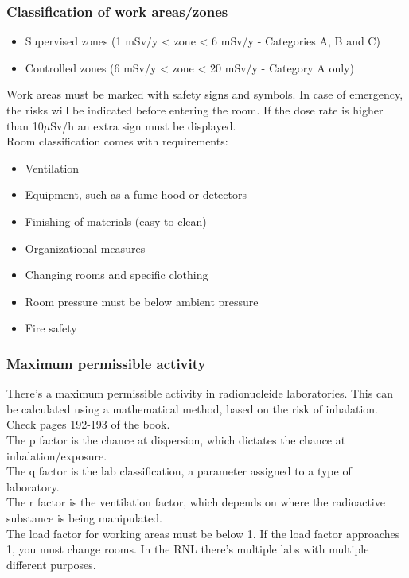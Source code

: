 \subsubsection{Classification of work areas/zones}
\begin{itemize}
	\item Supervised zones (1 mSv/y < zone < 6 mSv/y - Categories A, B and C)
	\item Controlled zones (6 mSv/y < zone < 20 mSv/y - Category A only)
\end{itemize}
Work areas must be marked with safety signs and symbols. In case of emergency, the risks will be indicated before entering the room. If the dose rate is higher than 10$\mu$Sv/h an extra sign must be displayed.\\
Room classification comes with requirements:
\begin{itemize}
	\item Ventilation
	\item Equipment, such as a fume hood or detectors
	\item Finishing of materials (easy to clean)
	\item Organizational measures
	\item Changing rooms and specific clothing
	\item Room pressure must be below ambient pressure
	\item Fire safety
\end{itemize}

\subsubsection{Maximum permissible activity}
There's a maximum permissible activity in radionucleide laboratories. This can be calculated using a mathematical method, based on the risk of inhalation. Check pages 192-193 of the book.\\
The p factor is the chance at dispersion, which dictates the chance at inhalation/exposure. \\
The q factor is the lab classification, a parameter assigned to a type of laboratory.\\
The r factor is the ventilation factor, which depends on where the radioactive substance is being manipulated.\\
The load factor for working areas must be below 1. If the load factor approaches 1, you must change rooms. In the RNL there's multiple labs with multiple different purposes.

